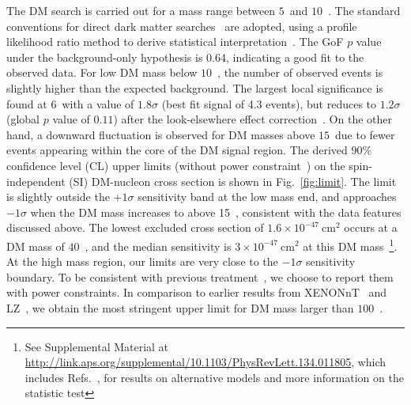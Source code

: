 \documentclass[%
 reprint,
superscriptaddress,
 amsmath,amssymb,
 aps,
 prl,
]{revtex4-1}
\begin{document}
The DM search is carried out for a mass range between $5$~\GeV and $10$~\TeV. The standard conventions for direct dark matter searches~\cite{Baxter2021_ReportResWhitePaper} are adopted, using a profile likelihood ratio method to derive statistical interpretation~\cite{Cowan:2010js}.
The GoF $p$ value under the background-only hypothesis is 0.64, indicating a good fit to the observed data.
For low DM mass below $10$~\GeV, the number of observed events is slightly higher than the expected background.
The largest local significance is found at $6$~\GeV with a value of $1.8\sigma$ (best fit signal of 4.3 events), but reduces to $1.2\sigma$ (global $p$ value of $0.11$) after the look-elsewhere effect correction~\cite{Gross2010_LEE}.
On the other hand, a downward fluctuation is observed for DM masses above $15$~\GeV due to fewer events appearing within the core of the DM signal region.
The derived 90\% confidence level (CL) upper limits (without power constraint~\cite{Cowan:2011an}) on the spin-independent (SI) DM-nucleon cross section is shown in Fig.~\ref{fig:limit}. The limit is slightly outside the $+1\sigma$ sensitivity band at the low mass end, and approaches $-1\sigma$ when the DM mass increases to above 15~\GeV, consistent with the data features discussed above. 
The lowest excluded cross section of $1.6 \times 10^{-47}~\mathrm{cm}^2$ occurs at a DM mass of $40$~\GeV, and the median sensitivity is $3 \times 10^{-47}~\mathrm{cm}^2$ at this DM mass~\footnote{See Supplemental Material at \url{http://link.aps.org/supplemental/10.1103/PhysRevLett.134.011805}, which includes Refs.~\cite{Klos2013_ChiralEFT, Amole2019_PICOSDp, atlas2018_2HDMa_propo, Huang2022_P4SD, atlas2023_2HDMa, Li2018_DMSimplified, Li2019_DMSimplifiedLoopEffects}, for results on alternative models and more information on the statistic test}.
At the high mass region, our limits are very close to the $-1\sigma$ sensitivity boundary.
To be consistent with previous treatment~\cite{Meng2021_P4First}, we choose to report them with power constraints.
In comparison to earlier results from XENONnT~\cite{Aprile2023_nTFirst} and LZ~\cite{Aalbers2023_LZFirst}, we obtain the most stringent upper limit for DM mass larger than $100$~\GeV.
\end{document}
